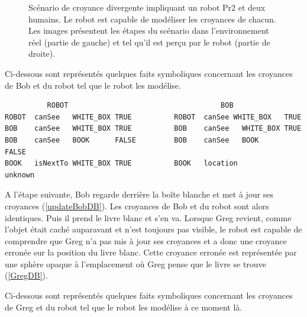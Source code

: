 \documentclass[a4paper,11pt,twoside]{StyleThese}
\begin{document}
\begin{figure}[ht!]
\begin{center}
 \end{center}
  \caption{Scénario de croyance divergente impliquant un robot Pr2 et deux humains. Le robot est capable de modéliser les croyances de chacun. Les images présentent les étapes du scénario dans l'environnement réel (partie de gauche) et tel qu'il est perçu par le robot (partie de droite).}
  \label{divB}
\end{figure}

Ci-dessous sont représentés quelques faits symboliques concernant les croyances de Bob et du robot tel que le robot les modélise.

\begin{scriptsize}
\begin{verbatim}
          ROBOT                                    BOB
ROBOT  canSee   WHITE_BOX TRUE          ROBOT  canSee WHITE_BOX   TRUE    
BOB    canSee   WHITE_BOX TRUE          BOB    canSee   WHITE_BOX TRUE
BOB    canSee   BOOK      FALSE         BOB    canSee   BOOK      FALSE
BOOK   isNextTo WHITE_BOX TRUE          BOOK   location           unknown
\end{verbatim}
\end{scriptsize}

A l'étape suivante, Bob regarde derrière la boîte blanche et met à jour ses croyances (\ref{updateBobDB}). Les croyances de Bob et du robot sont alors identiques.
Puis il prend le livre blanc et s'en va. Lorsque Greg revient, comme l'objet était caché auparavant et n'est toujours pas visible, le robot est capable de comprendre que Greg n'a pas mis à jour ses croyances et a donc une croyance erronée sur la position du livre blanc. Cette croyance erronée est représentée par une sphère opaque à l'emplacement où Greg pense que le livre se trouve (\ref{GregDB}).

Ci-dessous sont représentés quelques faits symboliques concernant les croyances de Greg et du robot tel que le robot les modélise à ce moment là.
\end{document}
